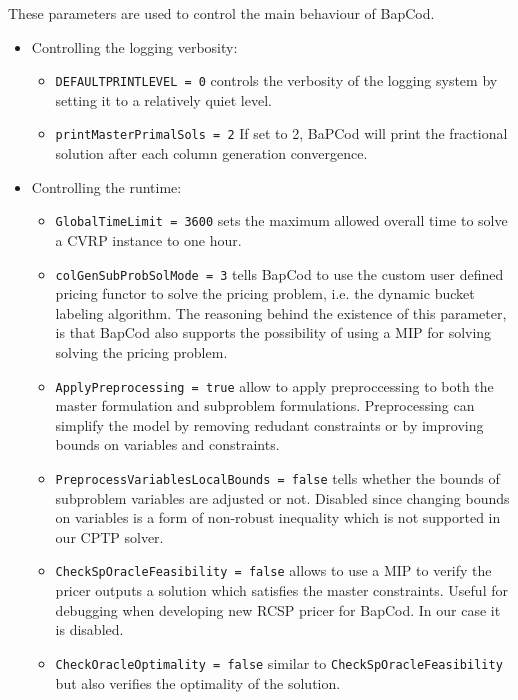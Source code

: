 These parameters are used to control the main behaviour of BapCod.

\begin{itemize}
	\item Controlling the logging verbosity:
	      \begin{itemize}
		      \item \texttt{DEFAULTPRINTLEVEL = 0} controls the verbosity of the logging system by setting it to a relatively quiet level.
		      \item \texttt{printMasterPrimalSols = 2} If set to 2, BaPCod will print the fractional solution after each column generation convergence.
	      \end{itemize}

	\item Controlling the runtime:
	      \begin{itemize}
		      \item \texttt{GlobalTimeLimit = 3600} sets the maximum allowed overall time to solve a CVRP instance to one hour.
		      \item \texttt{colGenSubProbSolMode = 3} tells BapCod to use the custom user defined pricing functor to solve the pricing problem, i.e. the dynamic bucket labeling algorithm.
		            The reasoning behind the existence of this parameter, is that BapCod also supports the possibility of using a MIP for solving solving the pricing problem.
		      \item \texttt{ApplyPreprocessing = true} allow to apply preproccessing to both the master formulation and subproblem formulations.
		            Preprocessing can simplify the model by removing redudant constraints or by improving bounds on variables and constraints.
		      \item \texttt{PreprocessVariablesLocalBounds = false} tells whether the bounds of subproblem variables are adjusted or not. Disabled since changing bounds on variables is a form of non-robust inequality which is not supported in our CPTP solver.

		      \item \texttt{CheckSpOracleFeasibility = false} allows to use a MIP to verify the pricer outputs a solution which satisfies the master constraints. Useful for debugging when developing new RCSP pricer for BapCod.
		            In our case it is disabled.
		      \item \texttt{CheckOracleOptimality = false} similar to \texttt{CheckSpOracleFeasibility} but also verifies the optimality of the solution.
	      \end{itemize}


\end{itemize}
